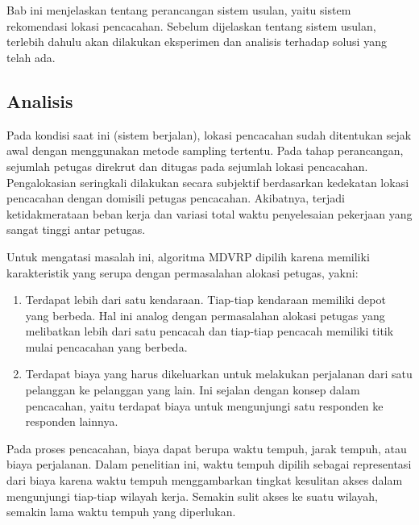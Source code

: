 \chapter{\babEmpat}


Bab ini menjelaskan tentang perancangan sistem usulan, yaitu sistem rekomendasi lokasi pencacahan. Sebelum dijelaskan tentang sistem usulan, terlebih dahulu akan dilakukan eksperimen dan analisis terhadap solusi yang telah ada.


\section{Analisis}
\label{sec:analysis}
Pada kondisi saat ini (sistem berjalan), lokasi pencacahan sudah ditentukan sejak awal dengan menggunakan metode sampling tertentu. Pada tahap perancangan, sejumlah petugas direkrut dan ditugas pada sejumlah lokasi pencacahan. Pengalokasian seringkali dilakukan secara subjektif berdasarkan kedekatan lokasi pencacahan dengan domisili petugas pencacahan. Akibatnya, terjadi ketidakmerataan beban kerja dan variasi total waktu penyelesaian pekerjaan yang sangat tinggi antar petugas. 

Untuk mengatasi masalah ini, algoritma MDVRP dipilih karena memiliki karakteristik yang serupa dengan permasalahan alokasi petugas, yakni: 

\begin{enumerate}
	\item Terdapat lebih dari satu kendaraan. Tiap-tiap kendaraan memiliki depot yang berbeda. Hal ini analog dengan permasalahan alokasi petugas yang melibatkan lebih dari satu pencacah dan tiap-tiap pencacah memiliki titik mulai pencacahan yang berbeda. 
	\item Terdapat biaya yang harus dikeluarkan untuk melakukan perjalanan dari satu pelanggan ke pelanggan yang lain. Ini sejalan dengan konsep dalam pencacahan, yaitu terdapat biaya untuk mengunjungi satu responden ke responden lainnya. 
\end{enumerate}

Pada proses pencacahan, biaya dapat berupa waktu tempuh, jarak tempuh, atau biaya perjalanan. Dalam penelitian ini, waktu tempuh dipilih sebagai representasi dari biaya karena waktu tempuh menggambarkan tingkat kesulitan akses dalam mengunjungi tiap-tiap wilayah kerja. Semakin sulit akses ke suatu wilayah, semakin lama waktu tempuh yang diperlukan. 

